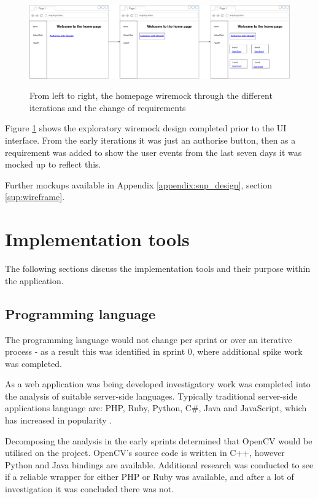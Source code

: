 \begin{figure}[H]
  \centering
  \includegraphics[scale=0.25]{images/homepage_wiremock.pdf}
  \label{fig:homepage_wiremock}
  \caption{From left to right, the homepage wiremock through the different iterations and the change of requirements}
\end{figure}

Figure \ref{fig:homepage_wiremock} shows the exploratory wiremock design completed prior to the UI interface. From the early iterations it was just an authorise button, then as a requirement was added to show the user events from the last seven days it was mocked up to reflect this.


Further mockups available in Appendix \ref{appendix:sup_design}, section \ref{sup:wireframe}.


\section{Implementation tools}
The following sections discuss the implementation tools and their purpose within the application.
\subsection{Programming language}
The programming language would not change per sprint or over an iterative process - as a result this was identified in sprint 0, where additional spike work was completed.

As a web application was being developed investigatory work was completed into the analysis of suitable server-side languages. Typically traditional server-side applications language are: PHP, Ruby, Python, C\#, Java and JavaScript, which has increased in popularity \cite{citeulike:14018462}.

Decomposing the analysis in the early sprints determined that OpenCV would be utilised on the project. OpenCV's source code is written in C++, however Python and Java bindings are available. Additional research was conducted to see if a reliable wrapper for either PHP or Ruby was available, and after a lot of investigation it was concluded there was not.

